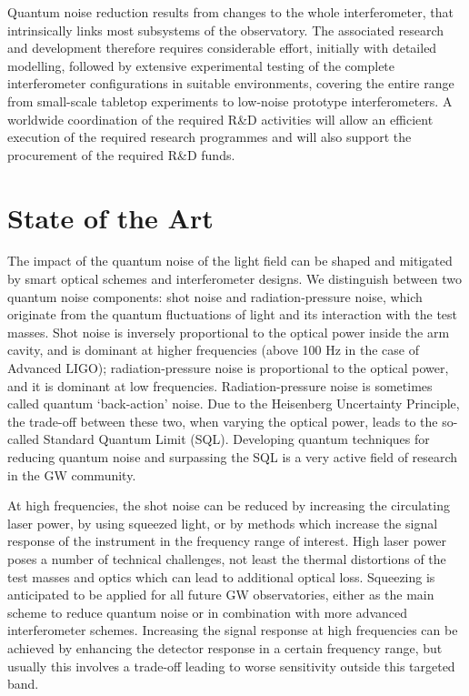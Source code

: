 Quantum noise reduction results from changes to the whole interferometer, that intrinsically links most subsystems of the observatory. The associated research and development therefore requires considerable effort, initially with detailed modelling, followed by extensive experimental testing of the complete interferometer configurations in suitable environments, covering the entire range from small-scale tabletop experiments to low-noise prototype interferometers. A worldwide coordination of the required R\&D activities will allow an efficient execution of the required research programmes and will also support the procurement of the required R\&D funds. 
 
\section{State of the Art}
The impact of the quantum noise of the light field can be shaped and mitigated by smart optical schemes and interferometer designs. We distinguish between two quantum noise components: shot noise and radiation-pressure noise, which originate from the quantum fluctuations of light and its interaction with the test masses. Shot noise is inversely proportional to the optical power inside the arm cavity, and is dominant at higher frequencies (above 100 Hz in the case of Advanced LIGO); radiation-pressure noise is proportional to the optical power, and it is dominant at low frequencies. Radiation-pressure noise is sometimes called quantum `back-action' noise. Due to the Heisenberg Uncertainty Principle, the trade-off between these two, when varying the optical power, leads to the so-called Standard Quantum Limit (SQL). Developing quantum techniques for reducing quantum noise and surpassing the SQL is a very active field of research in the GW community. 

At high frequencies, the shot noise can be reduced by increasing the circulating laser power, by using squeezed light, or by methods which increase the signal response of the instrument in the frequency range of interest. High laser power poses a number of technical challenges, not least the thermal distortions of the test masses and optics which can lead to additional optical loss.  Squeezing is anticipated to be applied for all future GW observatories, either as the main scheme to reduce quantum noise or in combination with more advanced interferometer schemes. Increasing the signal response at high frequencies can be achieved by enhancing the detector response in a certain frequency range, but usually this involves a trade-off leading to worse sensitivity outside this targeted band.  

